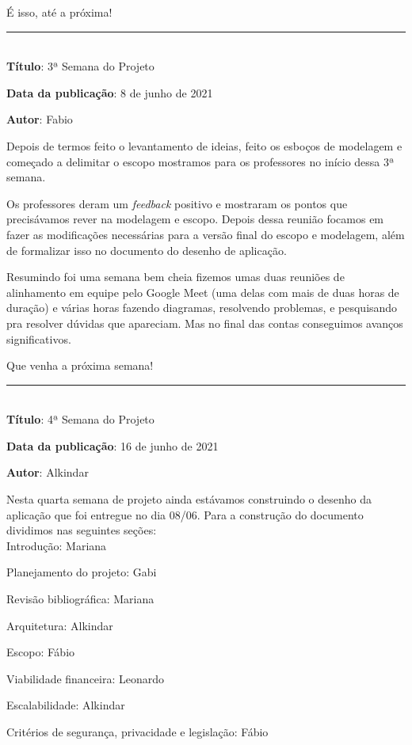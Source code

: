 É isso, até a próxima! \\

\protect\rule{13cm}{.5pt}
\\

\textbf{Título}: 3ª Semana do Projeto

\textbf{Data da publicação}: 8 de junho de 2021

\textbf{Autor}: Fabio

Depois de termos feito o levantamento de ideias, feito os esboços de modelagem e começado a delimitar o escopo mostramos para os professores no início dessa 3ª semana.

Os professores deram um \textit{feedback} positivo e mostraram os pontos que precisávamos rever na modelagem e escopo. Depois dessa reunião focamos em fazer as modificações necessárias para a versão final do escopo e modelagem, além de formalizar isso no documento do desenho de aplicação.

Resumindo foi uma semana bem cheia fizemos umas duas reuniões de alinhamento em equipe pelo Google Meet (uma delas com mais de duas horas de duração) e várias horas fazendo diagramas, resolvendo problemas, e pesquisando pra resolver dúvidas que apareciam. Mas no final das contas conseguimos avanços significativos.

Que venha a próxima semana!\\

\protect\rule{13cm}{.5pt}
\\

\textbf{Título}: 4ª Semana do Projeto

\textbf{Data da publicação}: 16 de junho de 2021

\textbf{Autor}: Alkindar

Nesta quarta semana de projeto ainda estávamos construindo o desenho da aplicação que foi entregue no dia 08/06. Para a construção do documento dividimos nas seguintes seções:\\



Introdução: Mariana

Planejamento do projeto: Gabi

Revisão bibliográfica: Mariana

Arquitetura: Alkindar

Escopo: Fábio 

Viabilidade financeira: Leonardo 

Escalabilidade: Alkindar

Critérios de segurança, privacidade e legislação: Fábio


